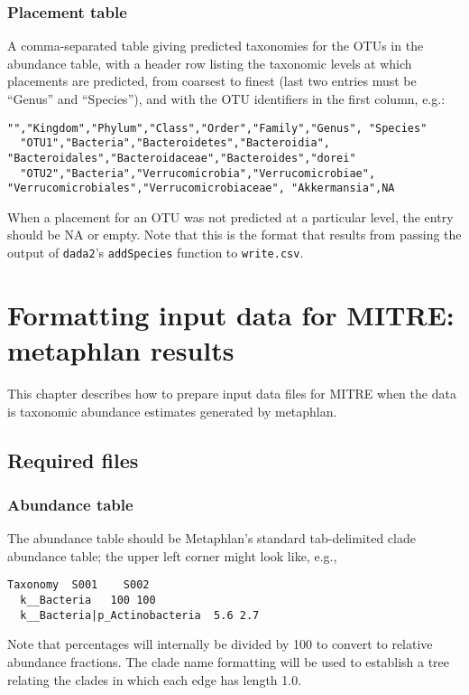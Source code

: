 \documentclass[12pt]{report}
\begin{document}
\subsection{Placement table}\label{placement_table}
A comma-separated table giving predicted taxonomies for the OTUs in
the abundance table, with a header row listing the taxonomic
levels at which placements are predicted, from coarsest to finest (last two entries must be ``Genus''
and ``Species''), and with the OTU identifiers in the first column, e.g.:
\begin{lstlisting}[caption=Example placement table]
  "","Kingdom","Phylum","Class","Order","Family","Genus", "Species"
  "OTU1","Bacteria","Bacteroidetes","Bacteroidia", "Bacteroidales","Bacteroidaceae","Bacteroides","dorei"
  "OTU2","Bacteria","Verrucomicrobia","Verrucomicrobiae", "Verrucomicrobiales","Verrucomicrobiaceae", "Akkermansia",NA
\end{lstlisting}
When a placement for an OTU was not predicted at a particular level,
the entry should be NA or empty.  Note that this is the format that
results from passing the output of \texttt{dada2}'s
\texttt{addSpecies} function to \texttt{write.csv}.

\chapter{Formatting input data for MITRE: metaphlan results}
This chapter describes how to prepare input data files
for MITRE when the data is taxonomic abundance estimates generated
by metaphlan.

\section{Required files}
\subsection{Abundance table}\label{metaphlan_abundance_data}
The abundance table should be Metaphlan's standard tab-delimited
clade abundance table; the upper left corner might look like, e.g.,
\begin{lstlisting}[caption=Example abundance data table]
  Taxonomy	S001	S002
  k__Bacteria	100	100
  k__Bacteria|p_Actinobacteria	5.6	2.7
\end{lstlisting}
Note that percentages will internally be divided by 100 to convert to
relative abundance fractions. The clade name formatting will be used
to establish a tree relating the clades in which each edge
has length 1.0.
\end{document}
